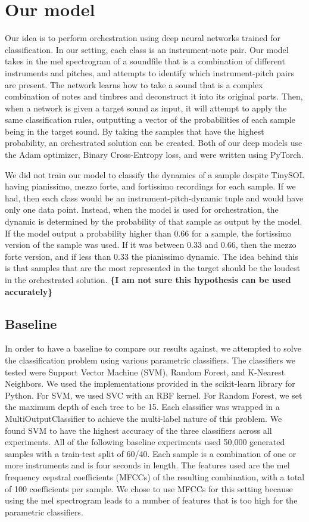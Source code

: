 \documentclass{article}
\begin{document}
\section{Our model}

Our idea is to perform orchestration using deep neural networks trained for classification. In our setting, each class is an instrument-note pair. Our model takes in the mel spectrogram of a soundfile that is a combination of different instruments and pitches, and attempts to identify which instrument-pitch pairs are present. The network learns how to take a sound that is a complex combination of notes and timbres and deconstruct it into its original parts. Then, when a network is given a target sound as input, it will attempt to apply the same classification rules, outputting a vector of the probabilities of each sample being in the target sound. By taking the samples that have the highest probability, an orchestrated solution can be created. Both of our deep models use the Adam optimizer, Binary Cross-Entropy loss, and were written using PyTorch.

We did not train our model to classify the dynamics of a sample despite TinySOL having pianissimo, mezzo forte, and fortissimo recordings for each sample. If we had, then each class would be an instrument-pitch-dynamic tuple and would have only one data point. Instead, when the model is used for orchestration, the dynamic is determined by the probability of that sample as output by the model. If the model output a probability higher than $0.66$ for a sample, the fortissimo version of the sample was used. If it was between $0.33$ and $0.66$, then the mezzo forte version, and if less than $0.33$ the pianissimo dynamic. The idea behind this is that samples that are the most represented in the target should be the loudest in the orchestrated solution. \textbf{\{I am not sure this hypothesis can be used accurately\}}

\subsection{Baseline}
In order to have a baseline to compare our results against, we attempted to solve the classification problem using various parametric classifiers. The classifiers we tested were Support Vector Machine (SVM), Random Forest, and K-Nearest Neighbors. We used the implementations provided in the scikit-learn library for Python. For SVM, we used SVC with an RBF kernel. For Random Forest, we set the maximum depth of each tree to be 15. Each classifier was wrapped in a MultiOutputClassifier to achieve the multi-label nature of this problem. We found SVM to have the highest accuracy of the three classifiers across all experiments. All of the following baseline experiments used 50,000 generated samples with a train-test split of 60/40. Each sample is a combination of one or more instruments and is four seconds in length. The features used are the mel frequency cepstral coefficients (MFCCs) of the resulting combination, with a total of 100 coefficients per sample. We chose to use MFCCs for this setting because using the mel spectrogram leads to a number of features that is too high for the parametric classifiers.
\end{document}
